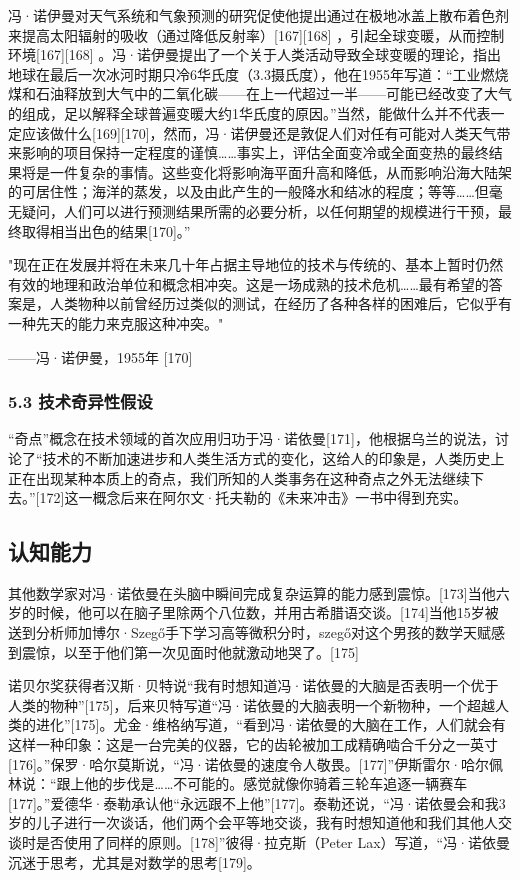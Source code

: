冯·诺伊曼对天气系统和气象预测的研究促使他提出通过在极地冰盖上散布着色剂来提高太阳辐射的吸收（通过降低反射率）[167][168] ，引起全球变暖，从而控制环境[167][168] 。冯·诺伊曼提出了一个关于人类活动导致全球变暖的理论，指出地球在最后一次冰河时期只冷6华氏度（3.3摄氏度），他在1955年写道：“工业燃烧煤和石油释放到大气中的二氧化碳——在上一代超过一半——可能已经改变了大气的组成，足以解释全球普遍变暖大约1华氏度的原因。”当然，能做什么并不代表一定应该做什么[169][170]，然而，冯·诺伊曼还是敦促人们对任有可能对人类天气带来影响的项目保持一定程度的谨慎……事实上，评估全面变冷或全面变热的最终结果将是一件复杂的事情。这些变化将影响海平面升高和降低，从而影响沿海大陆架的可居住性；海洋的蒸发，以及由此产生的一般降水和结冰的程度；等等……但毫无疑问，人们可以进行预测结果所需的必要分析，以任何期望的规模进行干预，最终取得相当出色的结果[170]。”

"现在正在发展并将在未来几十年占据主导地位的技术与传统的、基本上暂时仍然有效的地理和政治单位和概念相冲突。这是一场成熟的技术危机……最有希望的答案是，人类物种以前曾经历过类似的测试，在经历了各种各样的困难后，它似乎有一种先天的能力来克服这种冲突。"

——冯·诺伊曼，1955年 [170]
\subsubsection{5.3 技术奇异性假设}
“奇点”概念在技术领域的首次应用归功于冯·诺依曼[171]，他根据乌兰的说法，讨论了“技术的不断加速进步和人类生活方式的变化，这给人的印象是，人类历史上正在出现某种本质上的奇点，我们所知的人类事务在这种奇点之外无法继续下去。”[172]这一概念后来在阿尔文·托夫勒的《未来冲击》一书中得到充实。

\subsection{认知能力}
其他数学家对冯·诺依曼在头脑中瞬间完成复杂运算的能力感到震惊。[173]当他六岁的时候，他可以在脑子里除两个八位数，并用古希腊语交谈。[174]当他15岁被送到分析师加博尔·Szegő手下学习高等微积分时，szegő对这个男孩的数学天赋感到震惊，以至于他们第一次见面时他就激动地哭了。[175]

诺贝尔奖获得者汉斯·贝特说“我有时想知道冯·诺依曼的大脑是否表明一个优于人类的物种”[175]，后来贝特写道“冯·诺依曼的大脑表明一个新物种，一个超越人类的进化”[175]。尤金·维格纳写道，“看到冯·诺依曼的大脑在工作，人们就会有这样一种印象：这是一台完美的仪器，它的齿轮被加工成精确啮合千分之一英寸[176]。”保罗·哈尔莫斯说，“冯·诺依曼的速度令人敬畏。[177]”伊斯雷尔·哈尔佩林说：“跟上他的步伐是……不可能的。感觉就像你骑着三轮车追逐一辆赛车[177]。”爱德华·泰勒承认他“永远跟不上他”[177]。泰勒还说，“冯·诺依曼会和我3岁的儿子进行一次谈话，他们两个会平等地交谈，我有时想知道他和我们其他人交谈时是否使用了同样的原则。[178]”彼得·拉克斯（Peter Lax）写道，“冯·诺依曼沉迷于思考，尤其是对数学的思考[179]。

